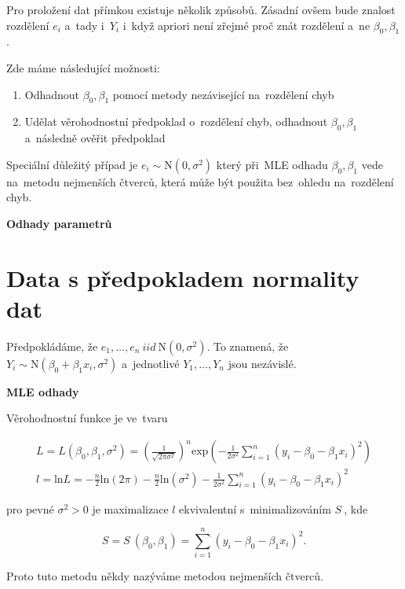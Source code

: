Pro proložení dat přímkou existuje několik způsobů. Zásadní ovšem bude znalost rozdělení $ e_{i} $ a~tady i~$ Y_{i} $ i~když apriori není zřejmé proč znát rozdělení a~ne $ \beta_{0}, \beta_{1} $.

Zde máme následující možnosti:

\begin{enumerate}
  \item Odhadnout $ \beta_{0} , \beta_{1} $ pomocí metody nezávisející na~rozdělení chyb
  \item Udělat věrohodnostní předpoklad o~rozdělení chyb, odhadnout $ \beta_{0} , \beta_{1} $ a~následně ověřit předpoklad
\end{enumerate}


\begin{remark}
 Speciální důležitý případ je $ e_{i} \sim \text{N}(0,\sigma^{2}) $ který při~MLE odhadu $ \beta_{0}, \beta_{1} $ vede na~metodu nejmenších čtverců, která může být použita bez~ohledu na~rozdělení chyb.
\end{remark}

\textbf{Odhady parametrů}
\section{Data s předpokladem normality dat}
Předpokládáme, že $ e_{1}, \dots , e_{n} ~iid~ \text{N}(0,\sigma^{2}) $. To znamená, že $ Y_{i} \sim \text{N}(\beta_{0} + \beta_{1} x_{i},\sigma^{2}) $ a~jednotlivé $ Y_{1}, \dots , Y_{n} $ jsou nezávislé.

\textbf{MLE odhady}

Věrohodnostní funkce je ve~tvaru

$$
\begin{aligned}
	L = L ( \beta_{0} , \beta_{1} , \sigma^{2} ) = \left( \frac{1}{ \sqrt{ 2 \pi \sigma^{2} }} \right) ^{n} \text{exp} \left( - \frac{1}{2 \sigma^{2} } \sum_{i = 1}^{n}( y_{i} -  \beta_{0}  - \beta_{1} x_{i} )^{2} \right) \\
l = \text{ln} L = -\frac{n}{2} \text{ln} ( 2 \pi ) -\frac{n}{2} \text{ln} (\sigma^{2} ) - \frac{1}{2 \sigma^{2} } \sum_{i = 1}^{n}( y_{i} -  \beta_{0}  - \beta_{1} x_{i})^{2}
\end{aligned}
$$

pro pevné $ \sigma^{2} > 0 $ je maximalizace $ l $ ekvivalentní s~minimalizováním $ S~$, kde

$$
S = S~( \beta_{0} , \beta_{1} ) = \sum_{i = 1}^{n}( y_{i} -  \beta_{0}  - \beta_{1} x_{i})^{2}.
$$

Proto tuto metodu někdy nazýváme metodou nejmenších čtverců.

